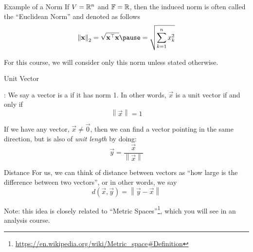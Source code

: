 \documentclass[xcoler=dvipsnames, aspectratio=169]{beamer}
\newcommand{\F}{\mathbb{F}}
\newcommand{\norm}[1]{\left\|#1\right\|}
\begin{document}
    \begin{frame}{Example of a Norm}
        If $V=\mathbb{R}^n$ and $\F=\R$, then the induced norm is often called the ``Euclidean Norm'' and
        denoted as follows\pause
        \[
            \norm{\vec{x}}_2 = \sqrt{\vec{x}^\top\vec{x}}\pause = \sqrt{\sum_{k=1}^nx_k^2}
        \]\pause

        For this course, we will consider only this norm unless stated otherwise.
    \end{frame}
    \begin{frame}{Unit Vector}
        \begin{defn}
            : We say a vector is a  if it has norm 1. In
            other words, $\vec{x}$ is a unit vector if and only if
            \[
                \norm{\vec{x}} = 1
            \]
        \end{defn}
        \pause
        If we have any vector, $\vec{x}\neq\vec{0}$, then we can find a vector pointing in the same
        direction, but is also of \emph{unit length} by doing:
        \[
            \vec{y} = \frac{\vec{x}}{\norm{\vec{x}}}
        \]
    \end{frame}
    \begin{frame}{Distance}
        For us, we can think of distance between vectors as ``how large is the difference between
        two vectors'', or in other words, we say
        \[
            d(\vec{x},\vec{y}) = \norm{\vec{y}-\vec{x}}
        \]

        Note: this idea is closely related to ``Metric Spaces''\footnote{\url{https://en.wikipedia.org/wiki/Metric\_space\#Definition}}, which you will see in an analysis course.
    \end{frame}
\end{document}
